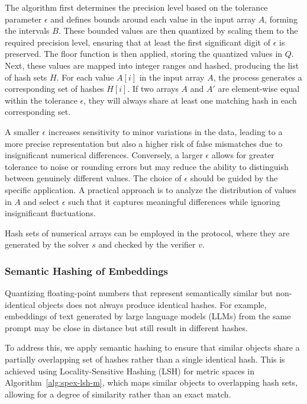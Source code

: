 \documentclass[sigconf, nonacm]{acmart}
\begin{document}
The algorithm first determines the precision level based on the tolerance parameter $\epsilon$ and defines bounds around each value in the input array $A$, forming the intervals $B$. These bounded values are then quantized by scaling them to the required precision level, ensuring that at least the first significant digit of $\epsilon$ is preserved. The floor function is then applied, storing the quantized values in $Q$. Next, these values are mapped into integer ranges and hashed, producing the list of hash sets $H$. For each value $A[i]$ in the input array $A$, the process generates a corresponding set of hashes $H[i]$. If two arrays $A$ and $A'$ are element-wise equal within the tolerance $\epsilon$, they will always share at least one matching hash in each corresponding set.

A smaller $\epsilon$ increases sensitivity to minor variations in the data, leading to a more precise representation but also a higher risk of false mismatches due to insignificant numerical differences. Conversely, a larger $\epsilon$ allows for greater tolerance to noise or rounding errors but may reduce the ability to distinguish between genuinely different values. The choice of $\epsilon$ should be guided by the specific application. A practical approach is to analyze the distribution of values in $A$ and select $\epsilon$ such that it captures meaningful differences while ignoring insignificant fluctuations.

Hash sets of numerical arrays can be employed in the  protocol, where they are generated by the solver $s$ and checked by the verifier $v$.

\subsubsection{Semantic Hashing of Embeddings}
\label{sec:semhash}
\balance %
Quantizing floating-point numbers that represent semantically similar but non-identical objects does not always produce identical hashes. For example, embeddings of text generated by large language models (LLMs) from the same prompt may be close in distance but still result in different hashes.

To address this, we apply semantic hashing to ensure that similar objects share a partially overlapping set of hashes rather than a single identical hash. This is achieved using Locality-Sensitive Hashing (LSH) \cite{jafari2021survey} for metric spaces in Algorithm~\ref{alg:spex-lsh-m}, which maps similar objects to overlapping hash sets,
allowing for a degree of similarity rather than an exact match.
\end{document}
